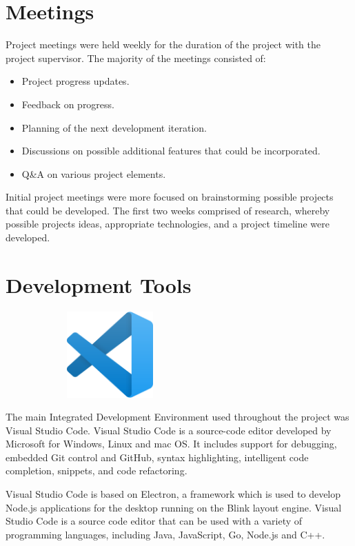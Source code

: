 \newpage
\section{Meetings}
Project meetings were held weekly for the duration of the project with the
project supervisor. The majority of the meetings consisted of:
\begin{itemize}
    \item Project progress updates.
    \item Feedback on progress.
    \item Planning of the next development iteration.
    \item Discussions on possible additional features that could be
    incorporated.
    \item Q&A on various project elements.
\end{itemize}
\par
\medskip
Initial project meetings were more focused on brainstorming possible projects
that could be developed. The first two weeks comprised of research, whereby 
possible projects ideas, appropriate technologies, and a project timeline were
developed.

\section{Development Tools}
\begin{center}
    \includegraphics[width=8cm,height=3.3cm,keepaspectratio]{images/vscode}
\end{center}
The main Integrated Development Environment used throughout the project was 
Visual Studio Code. Visual Studio Code is a source-code editor developed by 
Microsoft for Windows, Linux and mac OS. It includes support for debugging, 
embedded Git control and GitHub, syntax highlighting, intelligent code 
completion, snippets, and code refactoring. 
\par
\bigskip
Visual Studio Code is based on Electron, a framework which is used to develop
Node.js applications for the desktop running on the Blink layout engine. Visual 
Studio Code is a source code editor that can be used with a variety of 
programming languages, including Java, JavaScript, Go, Node.js and C++.

